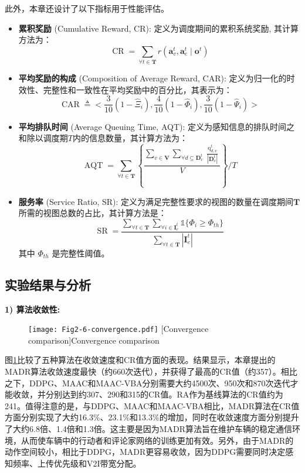 此外，本章还设计了以下指标用于性能评估。
\begin{itemize}
	\item \textbf{累积奖励} (Cumulative Reward, CR): 定义为调度期间的累积系统奖励, 其计算方法为：
		\begin{equation}
			\operatorname{CR} = \sum_{\forall t \in \mathbf{T}} r\left(\boldsymbol{a}_{v}^{t},\boldsymbol{a}_{e}^{t} \mid \boldsymbol{o}^{t}\right)
		\end{equation}
	\item \textbf{平均奖励的构成} (Composition of Average Reward, CAR): 定义为归一化的时效性、完整性和一致性在平均奖励中的百分比，其表示为：
		\begin{equation}
			\operatorname{CAR} \triangleq <\frac{3}{10}(1-\hat{\Xi}_{i}),\frac{4}{10}(1-\hat{\Phi}_{i}), \frac{3}{10}(1-\hat{\Psi}_{i})>
		\end{equation}
	\item \textbf{平均排队时间} (Average Queuing Time, AQT): 定义为感知信息的排队时间之和除以调度期$T$内的信息数量，其计算方法为：
		\begin{equation}
			\operatorname{AQT} =\sum_{\forall t \in \mathbf{T}} \left \{ \frac{\sum_{v \in \mathbf{V}} \sum_{\forall d \subseteq \mathbf{D}_{v}^t} \frac{\operatorname{q}_{d, v}^t}{|\mathbf{D}_{v}^t|} }{V} \right\} \bigg/ T
		\end{equation}
	\item \textbf{服务率} (Service Ratio, SR): 定义为满足完整性要求的视图的数量在调度期间$\mathbf{T}$所需的视图总数的占比，其计算方法是：
		\begin{equation}
			\operatorname{SR} = \frac{\sum_{\forall t \in \mathbf{T}}\sum_{\forall i \in \mathbf{I}_e^t} \mathds{1}\{\Phi_{i} \geq \Phi_{th}\}}{ \sum_{\forall t \in \mathbf{T}} |\mathbf{I}_e^t|}
		\end{equation}
	其中 $\Phi_{th}$ 是完整性阈值。
\end{itemize}

\subsection{实验结果与分析}

\textbf{1) 算法收敛性:}
\begin{figure}[b]
\centering
  \texttt{[image: Fig2-6-convergence.pdf]}
  [Convergence comparison]{Convergence comparison}
  \label{fig 2-6}
\end{figure} 
图\ref{fig 2-6}比较了五种算法在收敛速度和CR值方面的表现。结果显示，本章提出的MADR算法收敛速度最快（约660次迭代），并获得了最高的CR值（约357）。相比之下，DDPG、MAAC和MAAC-VBA分别需要大约4500次、950次和870次迭代才能收敛，并分别达到约307、290和315的CR值。RA作为基线算法的CR值约为241。值得注意的是，与DDPG、MAAC和MAAC-VBA相比，MADR算法在CR值方面分别实现了大约16.3\%、23.1\%和13.3\%的增加，同时在收敛速度方面分别提升了大约6.8倍、1.4倍和1.3倍。这主要是因为MADR算法旨在维护车辆的稳定通信环境，从而使车辆中的行动者和评论家网络的训练更加有效。另外，由于MADR的动作空间较小，相比于DDPG，MADR更容易收敛，因为DDPG需要同时决定感知频率、上传优先级和V2I带宽分配。

